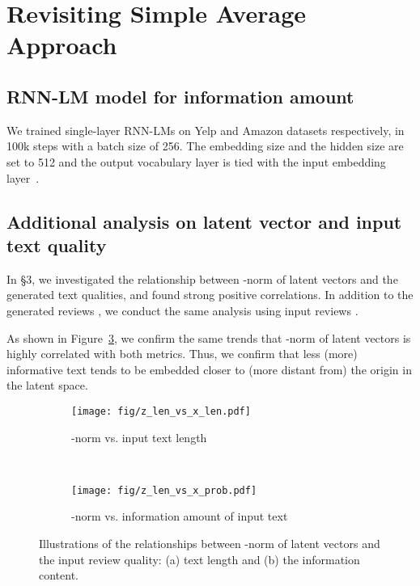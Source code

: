 \documentclass[11pt]{article}
\begin{document}
\section{Revisiting Simple Average Approach}

\subsection{RNN-LM model for information amount}
\label{app:rnnlm}
We trained single-layer RNN-LMs on Yelp and Amazon datasets respectively, in 100k steps with a batch size of 256.
The embedding size and the hidden size are set to 512 and the output vocabulary layer is tied with the input embedding layer~\cite{press-wolf-2017-using,inan2017tying}.

\subsection{Additional analysis on latent vector and input text quality}
\label{app:z_analysis}
In \S 3, we investigated the relationship between -norm of latent vectors and the generated text qualities, and found strong positive correlations.
In addition to the generated reviews , we conduct the same analysis using input reviews .

As shown in Figure~\ref{fig:z_analysis_app}, we confirm the same trends that -norm of latent vectors is highly correlated with both metrics. Thus, we confirm that less (more) informative text tends to be embedded closer to (more distant from) the origin in the latent space.

\begin{figure}[th]
    \centering
    \begin{subfigure}[b]{0.99\linewidth}
        \centering
        \texttt{[image: fig/z\_len\_vs\_x\_len.pdf]}
        \caption{-norm vs. input text length}
        \label{fig:z_x_app}
    \end{subfigure}
    ~\hfill
    \begin{subfigure}[b]{0.99\linewidth}
        \centering
        \texttt{[image: fig/z\_len\_vs\_x\_prob.pdf]}
        \caption{-norm vs. information amount of input text}
        \label{fig:z_prob_app}
    \end{subfigure}
    \caption{Illustrations of the relationships between -norm of latent vectors  and the input review quality: (a) text length and (b) the information content.}
    \label{fig:z_analysis_app}
\end{figure}
\end{document}
